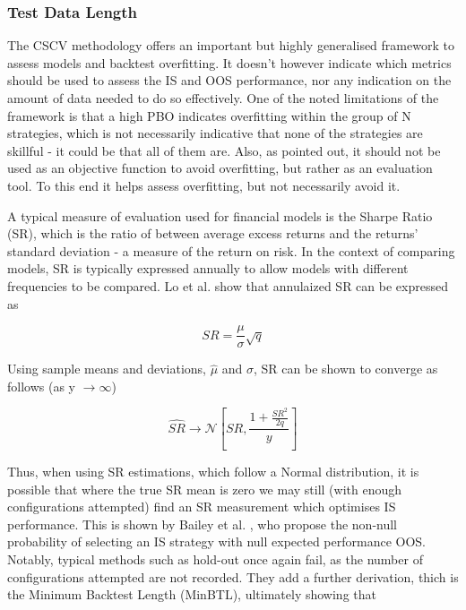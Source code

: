 \documentclass[a4paper,11pt,oneside]{article}
\theoremstyle{plain}
\theoremstyle{definition}
\begin{document}
\subsubsection{Test Data Length}

The CSCV methodology offers an important but highly generalised framework to assess models and backtest 
overfitting. It doesn’t however indicate which metrics should be used to assess the IS and OOS performance, nor 
any indication on the amount of data needed to do so effectively. One of the noted limitations of the framework is 
that a high PBO indicates overfitting within the group of N strategies, which is not necessarily indicative that none 
of the strategies are skillful - it could be that all of them are. Also, as pointed out, it should not be used as an 
objective function to avoid overfitting, but rather as an evaluation tool. To this end it helps assess overfitting, but 
not necessarily avoid it. 
\hfill \break 

A typical measure of evaluation used for financial models is the Sharpe Ratio (SR), which is the ratio of between 
average excess returns and the returns’ standard deviation - a measure of the return on risk. In the context of 
comparing models, SR is typically expressed annually to allow models with different frequencies to be compared. 
Lo et al. \cite{Lo} show that annulaized SR can be expressed as

\begin{equation}\label{SRAnnual}
SR=\frac{\mu}{\sigma}\sqrt{q}
\end{equation}

Using sample means and deviations, $\hat{\mu}$ and $\hat{\sigma}$, SR can be shown to converge as follows 
(as y $\rightarrow\infty$)

\begin{equation}\label{SRConvergence}
  \hat{SR}  \rightarrow \mathcal {N} [SR,\frac{1 + \frac{SR^2}{2q}}{y}]
\end{equation}

Thus, when using SR estimations, which follow a Normal distribution, it is possible that where the true SR mean is 
zero we may still (with enough configurations attempted) find an SR measurement which optimises IS performance. 
This is shown by Bailey et al. \cite{BaileyBTL}, who propose the non-null probability of selecting an IS strategy with null expected 
performance OOS. Notably, typical methods such as hold-out once again fail, as the number of configurations 
attempted are not recorded. They add a further derivation, thich is the Minimum Backtest Length (MinBTL), ultimately 
showing that
\end{document}
